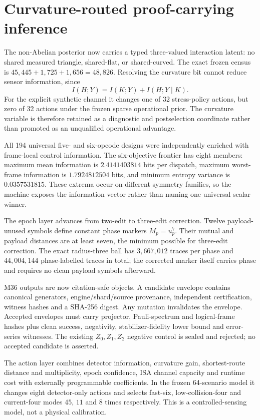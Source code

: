 \section{Curvature-routed proof-carrying inference}
\label{sec:bt3175-bt3186}

The non-Abelian posterior now carries a typed three-valued interaction latent: no shared measured triangle, shared-flat, or shared-curved.  The exact frozen census is $45{,}445+1{,}725+1{,}656=48{,}826$.  Resolving the curvature bit cannot reduce sensor information, since
\[
I(H;Y)=I(K;Y)+I(H;Y\mid K).
\]
For the explicit synthetic channel it changes one of 32 stress-policy actions, but zero of 32 actions under the frozen sparse operational prior.  The curvature variable is therefore retained as a diagnostic and postselection coordinate rather than promoted as an unqualified operational advantage.

All 194 universal five- and six-opcode designs were independently enriched with frame-local control information.  The six-objective frontier has eight members: maximum mean information is $2.4141403814$ bits per dispatch, maximum worst-frame information is $1.7924812504$ bits, and minimum entropy variance is $0.0357531815$.  These extrema occur on different symmetry families, so the machine exposes the information vector rather than naming one universal scalar winner.

The epoch layer advances from two-edit to three-edit correction.  Twelve payload-unused symbols define constant phase markers $M_p=u_p^7$.  Their mutual and payload distances are at least seven, the minimum possible for three-edit correction.  The exact radius-three ball has $3{,}667{,}012$ traces per phase and $44{,}004{,}144$ phase-labelled traces in total; the corrected marker itself carries phase and requires no clean payload symbols afterward.

M36 outputs are now citation-safe objects.  A candidate envelope contains canonical generators, engine/shard/source provenance, independent certification, witness hashes and a SHA-256 digest.  Any mutation invalidates the envelope.  Accepted envelopes must carry projector, Pauli-spectrum and logical-frame hashes plus clean success, negativity, stabilizer-fidelity lower bound and error-series witnesses.  The existing $Z_0,Z_1,Z_2$ negative control is sealed and rejected; no accepted candidate is asserted.

The action layer combines detector information, curvature gain, shortest-route distance and multiplicity, epoch confidence, ISA channel capacity and runtime cost with externally programmable coefficients.  In the frozen 64-scenario model it changes eight detector-only actions and selects fast-six, low-collision-four and current-four modes $45$, $11$ and $8$ times respectively.  This is a controlled-sensing model, not a physical calibration.

